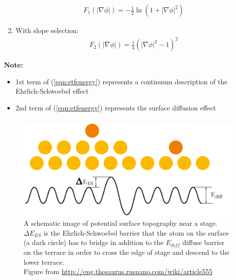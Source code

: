 \documentclass[amstex]{beamer}
\newcommand{\wuhao}{\fontsize{10.5pt}{\baselineskip}\selectfont}    %
\begin{document}
\begin{CJK*}{GBK}{kai}
\begin{frame}
\begin{enumerate}
\begin{eqnarray*}
F_1(|\nabla \phi|) = -\frac{1}{2} \ln{(1+|\nabla \phi|^2)}
\end{eqnarray*}
\item With slope selection: 
\begin{eqnarray*}
F_2(|\nabla \phi|) = \frac{1}{4} (|\nabla \phi|^2-1)^2
\end{eqnarray*}
\end{enumerate}
{\bf Note:}
\begin{itemize}
\item 1st term of (\ref{eqn:etfenergy}) represents a continuum description of the Ehrlich-Schwoebel effect
\item 2nd term of (\ref{eqn:etfenergy}) represents the surface diffusion effect
\end{itemize}
\end{frame}
 \begin{frame}
 \frametitle{\wuhao{\bf Ehrlich-Schwoebel Effect}}
\begin{figure}[htp]
\centering
\includegraphics[width=\textwidth]{figures/esbarrier.png}\hfill
\caption{A schematic image of potential surface topography near a stage. $\Delta E_{ES}$ is the Ehrlich-Schwoebel barrier that the atom on the surface (a dark circle) has to bridge in addition to the $E_{diff}$ diffuse barrier on the terrace in order to cross the edge of stage and descend to the lower terrace. \\
Figure from \url{http://eng.thesaurus.rusnano.com/wiki/article555}}
\end{figure}
\end{frame}
\begin{frame}
\frametitle{\wuhao{\bf Thin Film Epitaxial Equations with Slope Selection}}
\begin{itemize}

\end{itemize}
\end{frame}
\end{CJK*}
\end{document}

